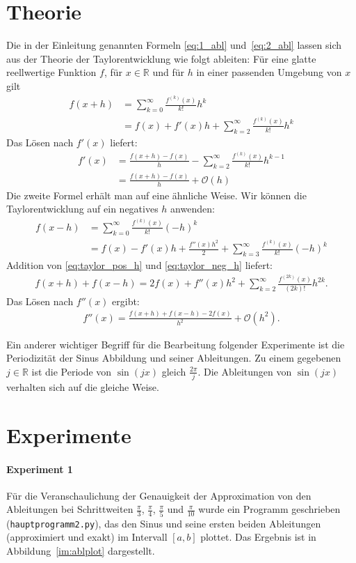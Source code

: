 \documentclass[smallheadings]{scrartcl}
\begin{document}
\section{Theorie}
Die in der Einleitung genannten Formeln  \eqref{eq:1_abl} und~\eqref{eq:2_abl}  lassen sich aus der Theorie der Taylorentwicklung wie folgt ableiten:
Für eine glatte reellwertige Funktion $f$, für $x\in\mathbb{R}$ und für $h$ in einer passenden Umgebung von $x$ gilt
\begin{align}
f(x+h)&=\sum_{k=0}^{\infty}\frac{f^{(k)}(x)}{k!}h^k\\
&=f(x)+f'(x)h+\sum_{k=2}^{\infty}\frac{f^{(k)}(x)}{k!}h^k
\label{eq:taylor_neg_h}
\end{align}
Das Lösen nach $f'(x)$ liefert:
\begin{align}
f'(x)&=\frac{f(x+h)-f(x)}{h}-\sum_{k=2}^{\infty}\frac{f^{(k)}(x)}{k!}h^{k-1}\\
&=\frac{f(x+h)-f(x)}{h}+\mathcal{O}(h)
\end{align}
Die zweite Formel erhält man auf eine ähnliche Weise. Wir können die Taylorentwicklung auf ein negatives $h$ anwenden:
\begin{align}
f(x-h)&=\sum_{k=0}^{\infty}\frac{f^{(k)}(x)}{k!}(-h)^k\\
&=f(x)-f'(x)h+\frac{f''(x)h^2}{2} +\sum_{k=3}^{\infty}\frac{f^{(k)}(x)}{k!}(-h)^k
\label{eq:taylor_pos_h}
\end{align}
Addition von \eqref{eq:taylor_pos_h} und \eqref{eq:taylor_neg_h} liefert:
\begin{align}
f(x+h)+f(x-h)=2f(x)+f''(x)h^2+\sum_{k=2}^{\infty}\frac{f^{(2k)}(x)}{(2k)!}h^{2k}.
\end{align}
Das Lösen nach $f''(x)$ ergibt:
\begin{align}
f''(x)=\frac{f(x+h)+f(x-h)-2f(x)}{h^2}+\mathcal{O}(h^2).
\end{align}


Ein anderer wichtiger Begriff für die Bearbeitung folgender Experimente ist die Periodizität der Sinus Abbildung und seiner Ableitungen. Zu einem gegebenen $j\in\mathbb{R}$ ist die Periode von $\sin(jx)$ gleich $\frac{2\pi}{j}$. Die Ableitungen von $\sin(jx)$ verhalten sich auf die gleiche Weise.

\section{Experimente}

\paragraph {Experiment 1}
Für die Veranschaulichung der Genauigkeit der Approximation von den Ableitungen bei Schrittweiten $\frac{\pi}{3}$, $\frac{\pi}{4}$, $\frac{\pi}{5}$ und $\frac{\pi}{10}$ wurde ein Programm geschrieben (\texttt{hauptprogramm2.py}), das den Sinus und seine ersten beiden Ableitungen (approximiert und exakt) im Intervall $\left[a,b\right]$ plottet. Das Ergebnis ist in Abbildung~\ref{im:ablplot} dargestellt.
\end{document}
